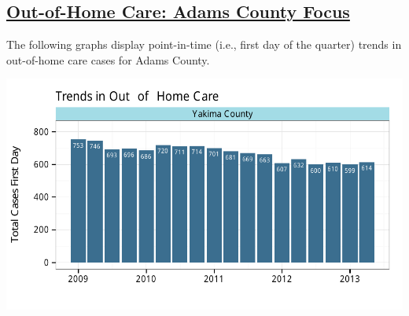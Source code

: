 \documentclass{article}\usepackage[]{graphicx}\usepackage[]{color}
\makeatletter
\def\maxwidth{ %
  \ifdim\Gin@nat@width>\linewidth
    \linewidth
  \else
    \Gin@nat@width
  \fi
}
\newenvironment{knitrout}{}{} %
\makeatother
\begin{document}
\begin{minipage}{\textwidth}
\subsection{\href{http://www.partnersforourchildren.org/child-well-being/visualizations/out-home-care/trends}
 {Out-of-Home Care: Adams County Focus}
}
The following graphs display point-in-time (i.e., first day of the quarter) trends in out-of-home care cases for
Adams County.\\[1pt]
\begin{knitrout}
\color{fgcolor}

{\centering \includegraphics[width=\maxwidth]{figure/ooh_focus} 

}



\end{knitrout}

\end{minipage}
\end{document}
